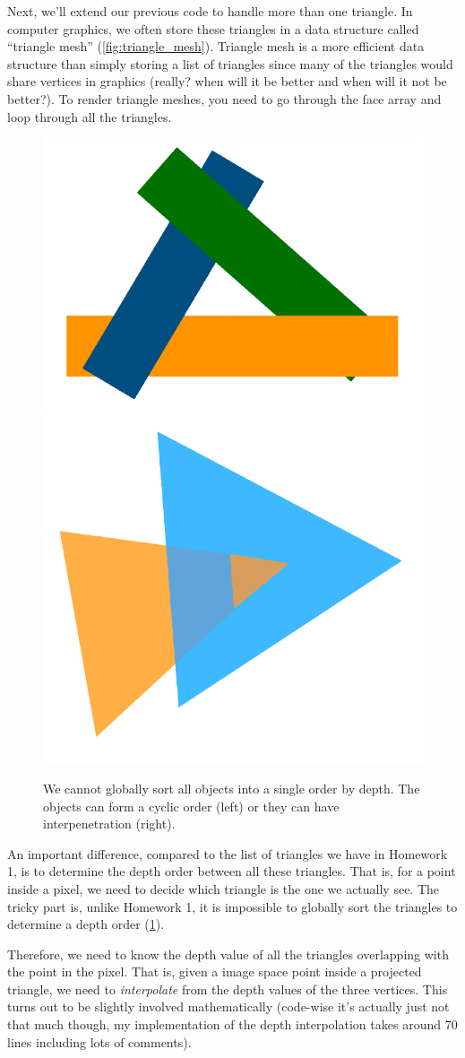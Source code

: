 Next, we'll extend our previous code to handle more than one triangle. In computer graphics, we often store these triangles in a data structure called ``triangle mesh'' (\cref{fig:triangle_mesh}). Triangle mesh is a more efficient data structure than simply storing a list of triangles since many of the triangles would share vertices in graphics (really? when will it be better and when will it not be better?). To render triangle meshes, you need to go through the face array and loop through all the triangles. 

\begin{figure}[h]
    \centering
    \includegraphics[width=0.4\linewidth]{imgs/cyclic.pdf}
    \includegraphics[width=0.4\linewidth]{imgs/interpenetration.pdf}
    \caption{We cannot globally sort all objects into a single order by depth. The objects can form a cyclic order (left) or they can have interpenetration (right).}
    \label{fig:depth_order}
\end{figure}

An important difference, compared to the list of triangles we have in Homework 1, is to determine the depth order between all these triangles. That is, for a point inside a pixel, we need to decide which triangle is the one we actually see. The tricky part is, unlike Homework 1, it is impossible to globally sort the triangles to determine a depth order (\cref{fig:depth_order}).

Therefore, we need to know the depth value of all the triangles overlapping with the point in the pixel. That is, given a image space point inside a projected triangle, we need to \emph{interpolate} from the depth values of the three vertices. This turns out to be slightly involved mathematically (code-wise it's actually just not that much though, my implementation of the depth interpolation takes around 70 lines including lots of comments). 

